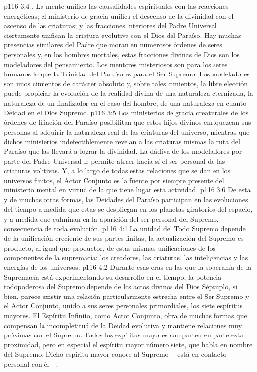\vs p116 3:4 . La mente unifica las causalidades espirituales con las reacciones energéticas; el ministerio de gracia unifica el descenso de la divinidad con el ascenso de las criaturas; y las fracciones interiores del Padre Universal ciertamente unifican la criatura evolutiva con el Dios del Paraíso. Hay muchas presencias similares del Padre que moran en numerosos órdenes de seres personales y, en los hombres mortales, estas fracciones divinas de Dios son los modeladores del pensamiento. Los mentores misteriosos son para los seres humanos lo que la Trinidad del Paraíso es para el Ser Supremo. Los modeladores son unos cimientos de carácter absoluto y, sobre tales cimientos, la libre elección puede propiciar la evolución de la realidad divina de una naturaleza eternizada, la naturaleza de un finalizador en el caso del hombre, de una naturaleza en cuanto Deidad en el Dios Supremo.
\vs p116 3:5 \pc Los ministerios de gracia creaturales de los órdenes de filiación del Paraíso posibilitan que estos hijos divinos enriquezcan sus personas al adquirir la naturaleza real de las criaturas del universo, mientras que dichos ministerios indefectiblemente revelan a las criaturas mismas la ruta del Paraíso que las llevará a lograr la divinidad. La dádiva de los modeladores por parte del Padre Universal le permite atraer hacia sí el ser personal de las criaturas volitivas. Y, a lo largo de todas estas relaciones que se dan en los universos finitos, el Actor Conjunto es la fuente por siempre presente del ministerio mental en virtud de la que tiene lugar esta actividad.
\vs p116 3:6 De esta y de muchas otras formas, las Deidades del Paraíso participan en las evoluciones del tiempo a medida que estas se despliegan en los planetas giratorios del espacio, y a medida que culminan en la aparición del ser personal del Supremo, consecuencia de toda evolución.
\vs p116 4:1 La unidad del Todo Supremo depende de la unificación creciente de sus partes finitas; la actualización del Supremo es producto, al igual que productor, de estas mismas unificaciones de los componentes de la supremacía: los creadores, las criaturas, las inteligencias y las energías de los universos.
\vs p116 4:2 \pc Durante esas eras en las que la soberanía de la Supremacía está experimentando su desarrollo en el tiempo, la potencia todopoderosa del Supremo depende de los actos divinos del Dios Séptuplo, si bien, parece existir una relación particularmente estrecha entre el Ser Supremo y el Actor Conjunto, unido a sus seres personales primordiales, los siete espíritus mayores. El Espíritu Infinito, como Actor Conjunto, obra de muchas formas que compensan la incompletitud de la Deidad evolutiva y mantiene relaciones muy próximas con el Supremo. Todos los espíritus mayores comparten en parte esta proximidad, pero en especial el espíritu mayor número siete, que habla en nombre del Supremo. Dicho espíritu mayor conoce al Supremo ---está en contacto personal con él---.
